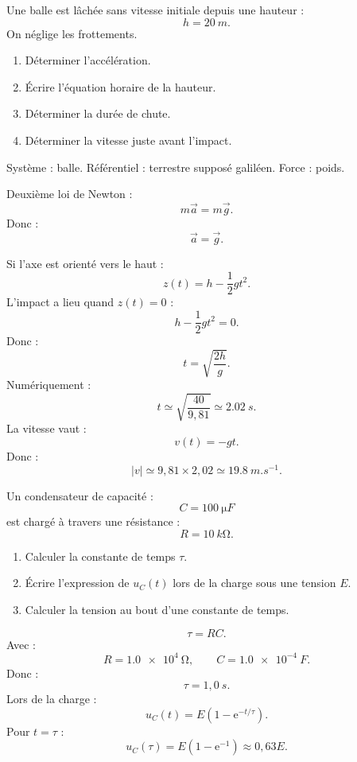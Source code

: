 \documentclass[11pt,a4paper]{article}
\newcommand{\e}{\mathrm{e}}
\begin{document}
\begin{exercice}
Une balle est lâchée sans vitesse initiale depuis une hauteur :
\[
h=\SI{20}{m}.
\]
On néglige les frottements.

\begin{enumerate}
  \item Déterminer l'accélération.
  \item Écrire l'équation horaire de la hauteur.
  \item Déterminer la durée de chute.
  \item Déterminer la vitesse juste avant l'impact.
\end{enumerate}

\begin{methode}[Correction]
Système : balle.  
Référentiel : terrestre supposé galiléen.  
Force : poids.

Deuxième loi de Newton :
\[
m\vec a=m\vec g.
\]
Donc :
\[
\vec a=\vec g.
\]

Si l'axe est orienté vers le haut :
\[
z(t)=h-\frac12gt^2.
\]
L'impact a lieu quand $z(t)=0$ :
\[
h-\frac12gt^2=0.
\]
Donc :
\[
t=\sqrt{\frac{2h}{g}}.
\]
Numériquement :
\[
t\simeq \sqrt{\frac{40}{9{,}81}}\simeq \SI{2.02}{s}.
\]
La vitesse vaut :
\[
v(t)=-gt.
\]
Donc :
\[
|v|\simeq 9{,}81\times2{,}02\simeq \SI{19.8}{m.s^{-1}}.
\]
\end{methode}
\end{exercice}

\begin{exercice}[4 — Circuit RC]
Un condensateur de capacité :
\[
C=\SI{100}{\micro F}
\]
est chargé à travers une résistance :
\[
R=\SI{10}{k\ohm}.
\]

\begin{enumerate}
  \item Calculer la constante de temps $\tau$.
  \item Écrire l'expression de $u_C(t)$ lors de la charge sous une tension $E$.
  \item Calculer la tension au bout d'une constante de temps.
\end{enumerate}

\begin{methode}[Correction]
\[
\tau=RC.
\]
Avec :
\[
R=\SI{1.0e4}{\ohm},
\qquad
C=\SI{1.0e-4}{F}.
\]
Donc :
\[
\tau=1{,}0\ \si{s}.
\]
Lors de la charge :
\[
u_C(t)=E(1-\e^{-t/\tau}).
\]
Pour $t=\tau$ :
\[
u_C(\tau)=E(1-\e^{-1})\approx0{,}63E.
\]
\end{methode}
\end{exercice}
\end{document}
